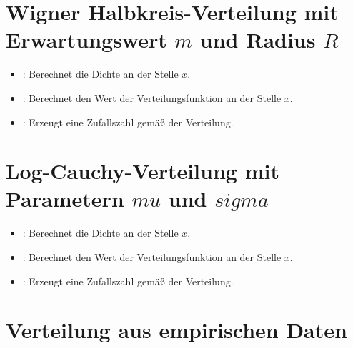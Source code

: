 \section{Wigner Halbkreis-Verteilung mit Erwartungswert \texorpdfstring{$m$}{m} und Radius \texorpdfstring{$R$}{R}}

\begin{itemize}

\item
{}:
Berechnet die Dichte an der Stelle $x$.

\item
{}:
Berechnet den Wert der Verteilungsfunktion an der Stelle $x$.

\item
{}:
Erzeugt eine Zufallszahl gemäß der Verteilung.

\end{itemize}



\section{Log-Cauchy-Verteilung mit Parametern \texorpdfstring{$mu$}{mu} und \texorpdfstring{$sigma$}{sigma}}

\begin{itemize}

\item
{}:
Berechnet die Dichte an der Stelle $x$.

\item
{}:
Berechnet den Wert der Verteilungsfunktion an der Stelle $x$.

\item
{}:
Erzeugt eine Zufallszahl gemäß der Verteilung.

\end{itemize}



\section{Verteilung aus empirischen Daten}

